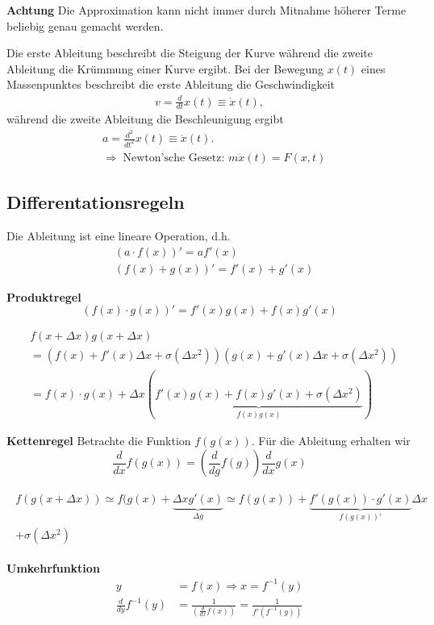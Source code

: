 \par{\bf Achtung}
Die Approximation kann nicht immer durch Mitnahme höherer Terme beliebig genau
gemacht werden.

\par
Die erste Ableitung beschreibt die Steigung der Kurve während die zweite
Ableitung die Krümmung einer Kurve ergibt. Bei der Bewegung $x(t)$ eines Massenpunktes beschreibt die erste Ableitung die
Geschwindigkeit
\begin{align*}
v = \frac{d}{dt}x(t) \equiv \dot{x}(t),
\end{align*} während die zweite
Ableitung die Beschleunigung ergibt
\begin{align*}
&a = \frac{d^2}{dt^2}x(t) \equiv \ddot{x}(t).\\
&\Rightarrow\;  \text{Newton'sche Gesetz: } m \ddot{x}(t) = F(x,t)
\end{align*}

\subsection{Differentationsregeln}
Die Ableitung ist eine lineare Operation, d.h.
\begin{align*}
&(a\cdot f(x))' = af'(x)\\
&(f(x)+g(x))' = f'(x) + g'(x)\nonumber
\end{align*}
\par{\bf Produktregel}
\begin{equation}
(f(x)\cdot g(x))' = f'(x)g(x) + f(x)g'(x)
\end{equation}
\begin{info}
\begin{align*}
&f(x+\Delta x)g(x+\Delta x) \\
&= (f(x) + f'(x)\Delta x+\sigma(\Delta x^2))(g(x)+g'(x)\Delta x+\sigma(\Delta
x^2)) \\ 
&= f(x)\cdot g(x) + \Delta x(\underbrace{f'(x)g(x)+f(x)g'(x)+\sigma(\Delta
x^2)}_{f(x)g(x)})
\end{align*}
\end{info}
\par{\bf Kettenregel}
Betrachte die Funktion $f(g(x))$. Für die
Ableitung erhalten wir
\begin{equation}
\frac{d}{dx}f(g(x)) = \left( \frac{d}{dg}f(g) \right) \frac{d}{dx}g(x)
\end{equation}
\begin{info}
\begin{align*}
\begin{split}
f(g(x+\Delta x)) \simeq f(g(x)+\underbrace{\Delta xg'(x)}_{\Delta g} \simeq
f(g(x))+\underbrace{f'(g(x))\cdot g'(x)}_{f(g(x))'}\Delta x \\+ \sigma(\Delta
x^2)
\end{split}
\end{align*}
\end{info}
\par{\bf Umkehrfunktion}
\begin{align*}
y &= f(x) \Rightarrow x = f^{-1}(y) \nonumber\\
\frac{d}{dy}f^{-1}(y) &= \frac{1}{\left(\frac{d}{dx}f(x)\right)} =
\frac{1}{f'(f^{-1}(y))}
\end{align*}